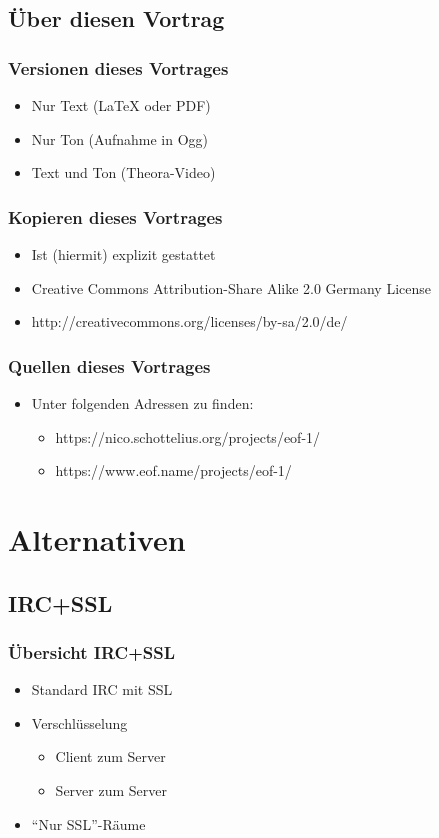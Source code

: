 \documentclass{beamer}
\begin{document}
\subsection{\"Uber diesen Vortrag}
\frame
{
  \frametitle{Versionen dieses Vortrages}

  \begin{itemize}
  \item Nur Text (\LaTeX{} oder PDF)
  \pause
  \item Nur Ton (Aufnahme in Ogg)
  \pause
  \item Text und Ton (Theora-Video)
  \end{itemize}
}

\frame
{
  \frametitle{Kopieren dieses Vortrages}

  \begin{itemize}
  \item Ist (hiermit) explizit gestattet
  \pause
  \item Creative Commons Attribution-Share Alike 2.0 Germany License
  \pause
  \item http://creativecommons.org/licenses/by-sa/2.0/de/
  \end{itemize}
}

\frame
{
  \frametitle{Quellen dieses Vortrages}

  \begin{itemize}
  \item Unter folgenden Adressen zu finden:
  \pause
  \begin{itemize}
  \item https://nico.schottelius.org/projects/eof-1/
  \pause
  \item https://www.eof.name/projects/eof-1/
  \end{itemize}
  \end{itemize}
}

\section{Alternativen}
\subsection{IRC+SSL}
\frame
{
  \frametitle{\"Ubersicht IRC+SSL}

  \begin{itemize}
  \item Standard IRC mit SSL
  \pause
  \item Verschl\"usselung
  \begin{itemize}
  \item Client zum Server
  \pause
  \item Server zum Server
  \pause
  \end{itemize}
  \item "`Nur SSL"'-R\"aume
  \end{itemize}
}
\end{document}
